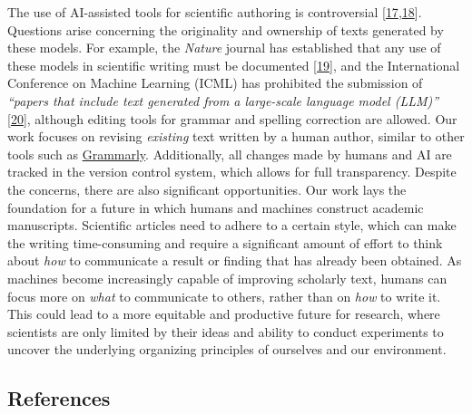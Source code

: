 \documentclass[
]{article}
\begin{document}
The use of AI-assisted tools for scientific authoring is controversial {[}\protect\hyperlink{ref-1EAonKBXJ}{17},\protect\hyperlink{ref-KJTJqmxc}{18}{]}.
Questions arise concerning the originality and ownership of texts generated by these models.
For example, the \emph{Nature} journal has established that any use of these models in scientific writing must be documented {[}\protect\hyperlink{ref-wQLVc4o7}{19}{]}, and the International Conference on Machine Learning (ICML) has prohibited the submission of \emph{``papers that include text generated from a large-scale language model (LLM)''} {[}\protect\hyperlink{ref-K58CKD6D}{20}{]}, although editing tools for grammar and spelling correction are allowed.
Our work focuses on revising \emph{existing} text written by a human author, similar to other tools such as \href{https://www.grammarly.com}{Grammarly}.
Additionally, all changes made by humans and AI are tracked in the version control system, which allows for full transparency.
Despite the concerns, there are also significant opportunities.
Our work lays the foundation for a future in which humans and machines construct academic manuscripts.
Scientific articles need to adhere to a certain style, which can make the writing time-consuming and require a significant amount of effort to think about \emph{how} to communicate a result or finding that has already been obtained.
As machines become increasingly capable of improving scholarly text, humans can focus more on \emph{what} to communicate to others, rather than on \emph{how} to write it.
This could lead to a more equitable and productive future for research, where scientists are only limited by their ideas and ability to conduct experiments to uncover the underlying organizing principles of ourselves and our environment.

\hypertarget{references}{%
\subsection{References}\label{references}}
\end{document}
